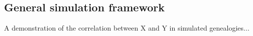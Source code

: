 \documentclass[12pt]{article}
\begin{document}
\subsection*{General simulation framework}












\clearpage



A demonstration of the correlation between X and Y in simulated genealogies...

\clearpage
\end{document}
